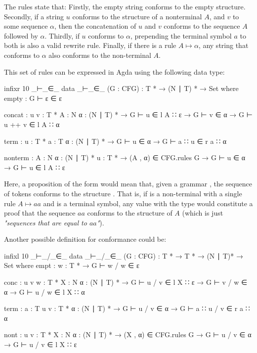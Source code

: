 	The rules state that: Firstly, the empty string conforms to the empty
	structure. Secondly, if a string $u$ conforms to the structure of a
	nonterminal $A$, and $v$ to some sequence $\alpha$, then the concatenation
	of $u$ and $v$ conforms to the sequence $A$ followed by $\alpha$. Thirdly,
	if $u$ conforms to $\alpha$, prepending the terminal symbol $a$ to both is
	also a valid rewrite rule. Finally, if there is a rule $A \mapsto \alpha$,
	any string that conforms to $\alpha$ also conforms to the non-terminal $A$.

	This set of rules can be expressed in Agda using the following data type:

	\begin{code}
		infixr 10 _⊢_∈_
		data _⊢_∈_ (G : CFG) :  T * → (N ∣ T) * → Set where
		  empty :
		G ⊢ ε ∈ ε

		  concat : {u v : T *} {A : N} {α : (N ∣ T) *} →
		G ⊢ u ∈ l A ∷ ε → G ⊢ v ∈ α → G ⊢ u ++ v ∈ l A ∷ α

		  term : {u : T *} {a : T} {α : (N ∣ T) *} →
		G ⊢ u ∈ α → G ⊢ a ∷ u ∈ r a ∷ α

		  nonterm : {A : N} {α : (N ∣ T) *} {u : T *} →
		(A , α) ∈ CFG.rules G → G ⊢ u ∈ α → G ⊢ u ∈ l A ∷ ε
	\end{code}


	Here, a proposition of the form  would mean that, given a
	grammar , the sequence of tokens  conforms to the
	structure . That is, if  is a non-terminal with a
	single rule $A \mapsto aa$ and  is a terminal symbol, any value
	with the type  would constitute a proof
	that the sequence $aa$ conforms to the structure of $A$ (which is just
	\emph{"sequences that are equal to $aa$"}).

	Another possible definition for conformance could be:

	\begin{code}
		infixl 10 _⊢_/_∈_
		data _⊢_/_∈_ (G : CFG) : T * → T * → (N ∣ T)* → Set where
		  empt : {w : T *} →
		G ⊢ w / w ∈ ε

		  conc : {u v w : T *} {X : N} {α : (N ∣ T) *} →
		G ⊢ u / v ∈ l X ∷ ε →
		G ⊢ v / w ∈ α →
		G ⊢ u / w ∈ l X ∷ α

		  term : {a : T} {u v : T *} {α : (N ∣ T) *} →
		G ⊢ u / v ∈ α →
		G ⊢ a ∷ u / v ∈ r a ∷ α

		  nont : {u v : T *} {X : N} {α : (N ∣ T) *} →
		(X , α) ∈ CFG.rules G →
		G ⊢ u / v ∈ α →
		G ⊢ u / v ∈ l X ∷ ε
	\end{code}

